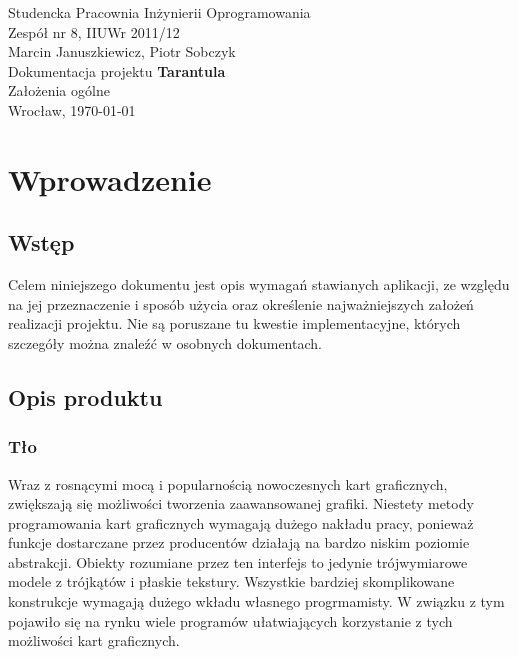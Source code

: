 \documentclass[11pt,leqno]{article}
\begin{document}
\begin{center}
\thispagestyle{empty}
{\Large Studencka Pracownia Inżynierii Oprogramowania}\\[0.5cm]
{\Large Zespół nr 8, IIUWr 2011/12}\\[2.5cm]

{Marcin Januszkiewicz, Piotr Sobczyk}\\[0.5cm]
{\huge Dokumentacja projektu \textbf{Tarantula}}\\[0.25cm]
{ Założenia ogólne}\\[0.5cm]
\vfill
{\large Wrocław, \today}
\end{center}
\newpage
\pagestyle{headings}
\tableofcontents

\newpage


\newpage
\section{Wprowadzenie}

\subsection{Wstęp}
Celem niniejszego dokumentu jest opis wymagań stawianych aplikacji, ze względu na jej przeznaczenie i 
sposób użycia oraz określenie najważniejszych założeń realizacji projektu. 
Nie są poruszane tu kwestie implementacyjne, których szczegóły można znaleźć w osobnych dokumentach.

\subsection{Opis produktu}

\subsubsection{Tło}

Wraz z rosnącymi mocą i popularnością nowoczesnych kart graficznych, zwiększają się możliwości tworzenia zaawansowanej grafiki. 
Niestety metody programowania kart graficznych wymagają dużego nakładu pracy, ponieważ funkcje dostarczane przez producentów 
działają na bardzo niskim poziomie abstrakcji. Obiekty rozumiane przez ten interfejs to jedynie trójwymiarowe modele z trójkątów i płaskie tekstury. 
Wszystkie bardziej skomplikowane konstrukcje wymagają dużego wkładu własnego progrmamisty. W związku z tym pojawiło się na rynku wiele programów 
ułatwiających korzystanie z tych możliwości kart graficznych. 
\end{document}
